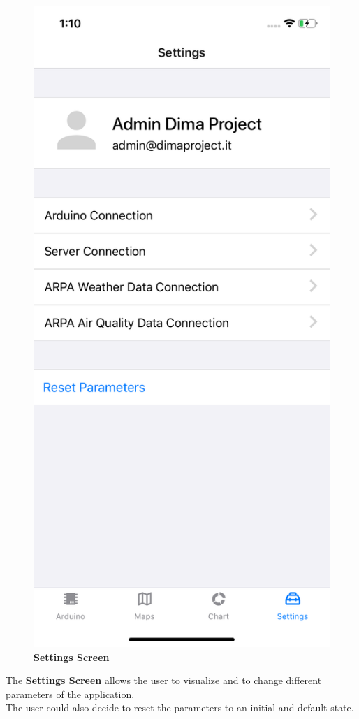 \begin{figure}[H]
\centering
\includegraphics[height=.6\textheight]{./img/ui/settings.png}
\caption{\textbf{Settings Screen}}
\end{figure}
\begin{center}
The \textbf{Settings Screen} allows the user to visualize and to change different parameters of the application.\\
The user could also decide to reset the parameters to an initial and default state.
\end{center}

